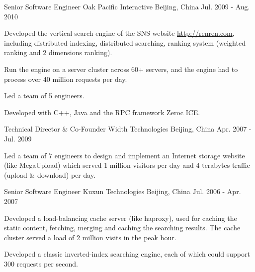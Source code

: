 \begin{cventries}
  \cventry
    {Senior Software Engineer} %
    {Oak Pacific Interactive} %
    {Beijing, China} %
    {Jul. 2009 - Aug. 2010} %
    {
      \begin{cvitems} %
        \item {Developed the vertical search engine of the SNS website \url{http://renren.com}, including distributed indexing, distributed searching, ranking system (weighted ranking and 2 dimensions ranking).}
        \item {Run the engine on a server cluster across 60+ servers, and the engine had to process over 40 million requests per day.}
        \item {Led a team of 5 engineers.}
        \item {Developed with C++, Java and the RPC framework Zeroc ICE.}
      \end{cvitems} 
    }

  \cventry
    {Technical Director \& Co-Founder} %
    {Width Technologies} %
    {Beijing, China} %
    {Apr. 2007 - Jul. 2009} %
    {
      \begin{cvitems} %
        \item {Led a team of 7 engineers to design and implement an Internet storage website (like MegaUpload) which served 1 million visitors per day and 4 terabytes traffic (upload \& download) per day.}
      \end{cvitems}
    }

  \cventry
    {Senior Software Engineer} %
    {Kuxun Technologies} %
    {Beijing, China} %
    {Jul. 2006 - Apr. 2007} %
    {
      \begin{cvitems} %
        \item {Developed a load-balancing cache server (like haproxy), used for caching the static content, fetching, merging and caching the searching results. The cache cluster served a load of 2 million visits in the peak hour.}
        \item {Developed a classic inverted-index searching engine, each of which could support 300 requests per second.}
      \end{cvitems}
    }


\end{cventries}
